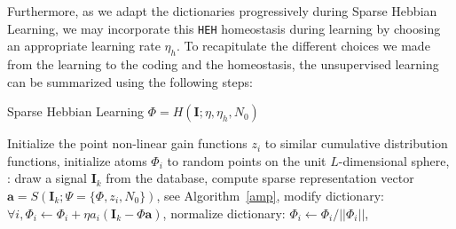 \documentclass[draft]{article} %
\newcommand{\coef}{\mathbf{a}} %
\newcommand{\image}{\mathbf{I}} %
\newcommand{\dico}{\Phi} %
\newcommand{\norm}[1]{|\!| #1 |\!|}
\newcommand{\seeEq}[1]{Eq.~\ref{eq:#1}}%
\begin{document}
Furthermore, as we adapt the dictionaries progressively during Sparse Hebbian Learning, we may incorporate this \texttt{HEH} homeostasis during learning by choosing an appropriate learning rate $\eta_h$.
To recapitulate the different choices we made from the learning to the coding and the homeostasis, the unsupervised learning can be summarized using the following steps:
\begin{algorithm}
\caption{Sparse Hebbian Learning  $\dico = H(\image; \eta, \eta_h, N_0)$}\label{shl}
\begin{algorithmic}[1]
\State Initialize the point non-linear gain functions $z_i$ to similar cumulative distribution functions,%
\State initialize atoms $\dico_i$ to random points on the unit $L$-dimensional sphere,
:
\State draw a signal $\image_k$ from the database,%
\State compute sparse representation vector $\coef = S(\image_k; \Psi=\{\dico, z_i, N_0\})$, see Algorithm~\ref{amp},
\State modify dictionary: $\forall i, \dico_{i} \leftarrow \dico_{i} + \eta a_{i} (\image_k - \dico\coef)$,%
\State normalize dictionary: $\dico_{i} \leftarrow \dico_{i} / \norm{\dico_{i}}$,%
\EndFor
\end{algorithmic}
\end{algorithm}
%
\end{document}
